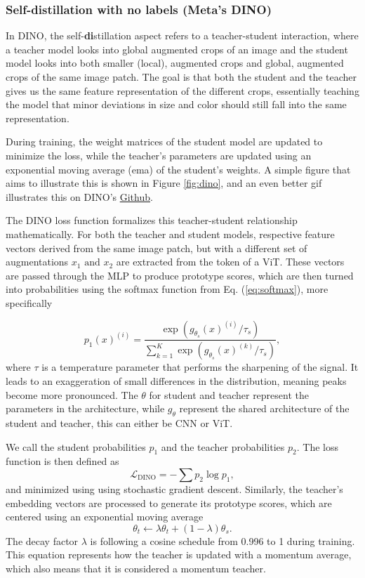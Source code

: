 \subsubsection{Self-\textbf{di}stillation with \textbf{no} labels (Meta's \textbf{DINO})} \label{sssec:dino}

In DINO, the self-\textbf{di}stillation aspect refers to a teacher-student interaction, where a teacher model looks into global augmented crops of an image and the student model looks into both smaller (local), augmented crops and global, augmented crops of the same image patch. The goal is that both the student and the teacher gives us the same feature representation of the different crops, essentially teaching the model that minor deviations in size and color should still fall into the same representation. 

During training, the weight matrices of the student model are updated to minimize the loss, while the teacher’s parameters are updated using an exponential moving average (ema) of the student’s weights. A simple figure that aims to illustrate this is shown in Figure \ref{fig:dino}, and an even better gif illustrates this on DINO's \hyperlink{https://github.com/facebookresearch/dino}{Github}.

%
The DINO loss function formalizes this teacher-student relationship mathematically. For both the teacher and student models, respective feature vectors derived from the same image patch, but with a different set of augmentations $x_1 \text{ and } x_2$ are extracted from the token of a ViT. These vectors are passed through the MLP to produce prototype scores, which are then turned into probabilities using the softmax function from Eq. (\ref{eq:softmax}), more specifically

\begin{equation} \label{eq:dino-softmax}
p_1(x)^{(i)} = \frac{\exp\left(g_{\theta_s}(x)^{(i)} / \tau_s\right)}{\sum_{k=1}^K \exp\left(g_{\theta_s}(x)^{(k)} / \tau_s\right)},
\end{equation}
where $\tau$ is a temperature parameter that performs the sharpening of the signal. It leads to an exaggeration of small differences in the distribution, meaning peaks become more pronounced. The $\theta$ for student and teacher represent the parameters in the architecture, while $g_\theta$ represent the shared architecture of the student and teacher, this can either be CNN or ViT.

We call the student probabilities \( p_1 \) and the teacher probabilities \( p_2 \). The loss function is then defined as
\[
\mathcal{L}_{\text{DINO}} = -\sum p_2 \log p_1,
\]
and minimized using using stochastic gradient descent. Similarly, the teacher’s embedding vectors are processed to generate its prototype scores, which are centered using an exponential moving average 
\begin{equation} \label{eq:ema}
\theta_t \gets \lambda \theta_t + (1 - \lambda) \theta_s. 
\end{equation}
%
The decay factor $\lambda$ is following a cosine schedule from 0.996 to 1 during training. This equation represents how the teacher is updated with a momentum average, which also means that it is considered a momentum teacher.

